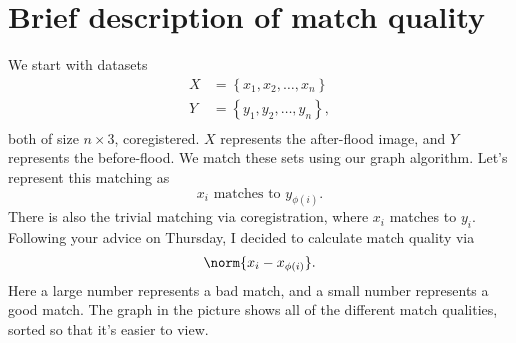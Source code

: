 \documentclass[12pt]{article}
\begin{document}
\section*{Brief description of match quality}

We start with datasets
\begin{align*}
  X &= \left\{x_1, x_2,\ldots, x_n\right\} \\
  Y &= \left\{y_1, y_2,\ldots, y_n\right\}, \\
\end{align*}
both of size $n\times 3$, coregistered. $X$ represents the after-flood image, and $Y$ represents the before-flood. We match these sets using our graph algorithm. Let's represent this matching as
\[x_i \text{ matches to } y_{\phi(i)}.\]
There is also the trivial matching via coregistration, where $x_i$ matches to $y_i$. Following your advice on Thursday, I decided to calculate match quality via
\[\norm{x_i - x_{\phi(i)}}.\]
Here a large number represents a bad match, and a small number represents a good match. The graph in the picture shows all of the different match qualities, sorted so that it's easier to view.
\end{document}
